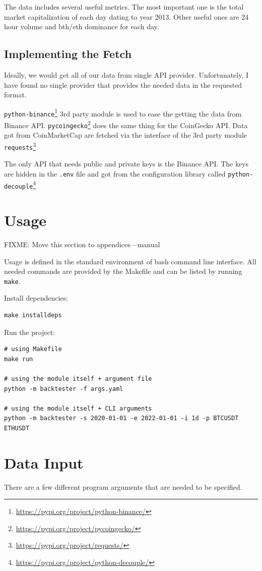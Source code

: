 The data includes several useful metrics. The most important one is the total market capitalization of each day dating to year 2013. Other useful ones are 24 hour volume and bth/eth dominance for each day.

\subsection*{Implementing the Fetch}
Ideally, we would get all of our data from single API provider. Unfortunately, I have found no single provider that provides the needed data in the requested format.

\texttt{python-binance}\footnote{\url{https://pypi.org/project/python-binance/}} 3rd party module is used to ease the getting the data from Binance API. \texttt{pycoingecko}\footnote{\url{https://pypi.org/project/pycoingecko/}} does the same thing for the CoinGecko API. Data got from CoinMarketCap are fetched via the interface of the 3rd party module \texttt{requests}\footnote{\url{https://pypi.org/project/requests/}}

The only API that needs public and private keys is the Binance API. The keys are hidden in the \texttt{.env} file and got from the configuration library called \texttt{python-decouple}\footnote{\url{https://pypi.org/project/python-decouple/}}

\section{Usage}
FIXME: Move this section to appendices---manual

Usage is defined in the standard environment of bash command line interface. All needed commands are provided by the Makefile and can be listed by running \texttt{make}.

Install dependencies:
\begin{verbatim}
make installdeps
\end{verbatim}

Run the project:
\begin{verbatim}
# using Makefile
make run

# using the module itself + argument file
python -m backtester -f args.yaml

# using the module itself + CLI arguments
python -m backtester -s 2020-01-01 -e 2022-01-01 -i 1d -p BTCUSDT ETHUSDT
\end{verbatim}

\section{Data Input}
There are a few different program arguments that are needed to be specified.


